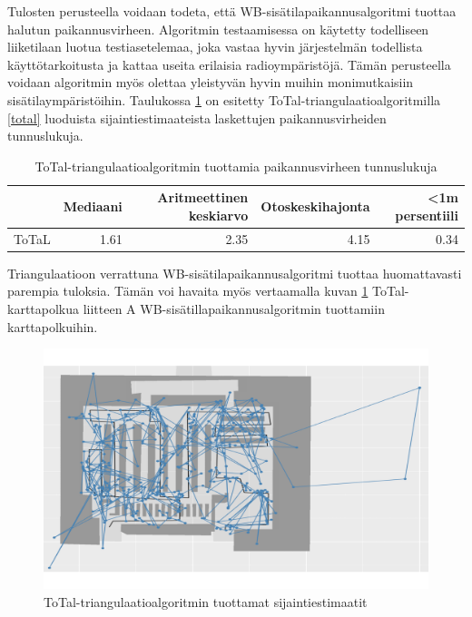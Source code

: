 \documentclass[
  12pt,
  a4paper, twoside]{book}
\begin{document}
Tulosten perusteella voidaan todeta, että WB-sisätilapaikannusalgoritmi tuottaa halutun paikannusvirheen. Algoritmin testaamisessa on käytetty todelliseen liiketilaan luotua testiasetelemaa, joka vastaa hyvin järjestelmän todellista käyttötarkoitusta ja kattaa useita erilaisia radioympäristöjä. Tämän perusteella voidaan algoritmin myös olettaa yleistyvän hyvin muihin monimutkaisiin sisätilaympäristöihin. Taulukossa \ref{tab:tulokset-total} on esitetty ToTal-triangulaatioalgoritmilla \ref{total} luoduista sijaintiestimaateista laskettujen paikannusvirheiden tunnuslukuja.

\begin{table}

\caption{\label{tab:tulokset-total}ToTal-triangulaatioalgoritmin tuottamia paikannusvirheen tunnuslukuja}
\centering
\begin{tabular}[t]{lrrrr}
\toprule
  & Mediaani & Aritmeettinen keskiarvo & Otoskeskihajonta & <1m persentiili\\
\midrule
ToTaL & 1.61 & 2.35 & 4.15 & 0.34\\
\bottomrule
\end{tabular}
\end{table}

Triangulaatioon verrattuna WB-sisätilapaikannusalgoritmi tuottaa huomattavasti parempia tuloksia. Tämän voi havaita myös vertaamalla kuvan \ref{fig:total-karttapolku} ToTal-karttapolkua liitteen A WB-sisätillapaikannusalgoritmin tuottamiin karttapolkuihin.

\begin{figure}[H]
\centering
\includegraphics[width=15cm]{total-karttapolku}
\caption{ToTal-triangulaatioalgoritmin tuottamat sijaintiestimaatit}
\label{fig:total-karttapolku}
\end{figure}
\end{document}
